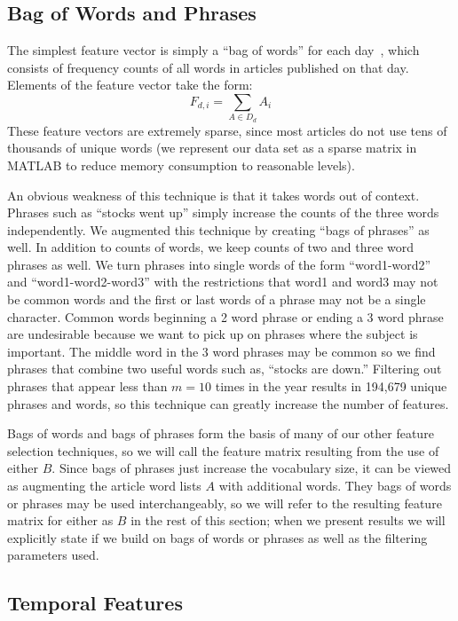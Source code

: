 \documentclass[10pt]{article}
\begin{document}
\subsection{Bag of Words and Phrases}

The simplest feature vector is simply a ``bag of words'' for each day~\cite{featurehash}, which consists of frequency counts of all words in articles published on that day. Elements of the feature vector take the form: $$\displaystyle F_{d,i} = \sum_{A \in D_d}{A_i}$$ These feature vectors are extremely sparse, since most articles do not use tens of thousands of unique words (we represent our data set as a sparse matrix
in MATLAB to reduce memory consumption to reasonable levels).

An obvious weakness of this technique is that it takes words out of context. Phrases such as ``stocks went up'' simply increase the counts of the three words independently. We augmented this technique by creating ``bags of phrases'' as well. In addition to counts of words, we keep counts of two and three word phrases
as well. We turn phrases into single words of the form ``word1-word2'' and ``word1-word2-word3'' with the restrictions that word1 and word3 may not be common words and the first or last words of a phrase may not be a single character. Common words beginning a 2 word phrase or ending a 3 word phrase are undesirable because we want to pick up on phrases where the subject is important. The middle word in the 3 word phrases may be common so we find phrases that combine two useful words such as, ``stocks are down.'' Filtering out phrases that appear less than $m = 10$ times in the year results in 194,679 unique phrases and words, so this technique can greatly increase the number of features.

Bags of words and bags of phrases form the basis of many of our other feature selection techniques, so we will call the feature matrix resulting from the use of either $B$. Since bags of phrases just increase the vocabulary size, it can be viewed as augmenting the article word lists $A$ with additional words. They bags of words or phrases may be used interchangeably, so we will refer to the resulting feature matrix for either as $B$ in the rest of this section; when we present results we will explicitly state if we build on bags of words or phrases as well as the filtering parameters used.

\subsection{Temporal Features}
\end{document}
